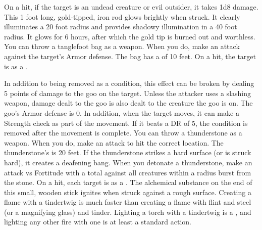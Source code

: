         On a hit, if the target is an undead creature or evil outsider, it takes 1d8 damage.
         This 1 foot long, gold-tipped, iron rod glows brightly when struck. It clearly illuminates a 20 foot radius and provides shadowy illumination in a 40 foot radius. It glows for 6 hours, after which the gold tip is burned out and worthless.
         You can throw a tanglefoot bag as a weapon.
        When you do, make an attack against the target's Armor defense.
        The bag has a  of 10 feet.
        On a hit, the target is \slowed as a .
        \par In addition to being removed as a condition, this effect can be broken by dealing 5 points of damage to the goo on the target.
        Unless the attacker uses a slashing weapon, damage dealt to the goo is also dealt to the creature the goo is on.
        The goo's Armor defense is 0. %
        In addition, when the target moves, it can make a Strength check as part of the movement.
        If it beats a DR of 5, the condition is removed after the movement is complete.
         You can throw a thunderstone as a weapon.
        When you do, make an attack to hit the correct location.
        The thunderstone's  is 20 feet.
        If the thunderstone strikes a hard surface (or is struck hard), it creates a deafening bang.
        When you detonate a thunderstone, make an attack vs Fortitude with a  total  against all creatures within a \areasmall radius burst from the stone.
        On a hit, each target is  as a .
         The alchemical substance on the end of this small, wooden stick ignites when struck against a rough surface. Creating a flame with a tindertwig is much faster than creating a flame with flint and steel (or a magnifying glass) and tinder. Lighting a torch with a tindertwig is a , and lighting any other fire with one is at least a standard action.

